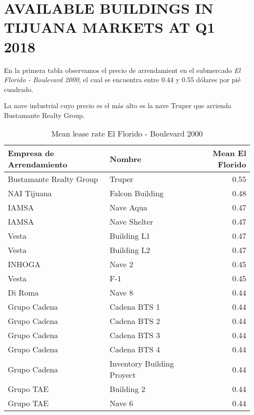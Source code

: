 \documentclass[]{article}
\title{}
\author{}
\date{}
\begin{document}
\section{AVAILABLE BUILDINGS IN TIJUANA MARKETS AT Q1
2018}\label{available-buildings-in-tijuana-markets-at-q1-2018}

\btwocol

En la primera tabla observamos el precio de arrendamient en el
submercado \emph{El Florido - Boulevard 2000}, el cual se encuentra
entre 0.44 y 0.55 dólares por pié cuadrado.

La nave industrial cuyo precio es el más alto es la nave Truper que
arrienda Bustamante Realty Group.

\begin{table}[ht]
\centering
\caption{Mean lease rate El Florido - Boulevard 2000} 
\begin{tabular}{llr}
  \hline
Empresa de Arrendamiento & Nombre & Mean El Florido \\ 
  \hline
Bustamante Realty Group & Truper & 0.55 \\ 
  NAI Tijuana & Falcon Building & 0.48 \\ 
  IAMSA & Nave Aqua & 0.47 \\ 
  IAMSA & Nave Shelter & 0.47 \\ 
  Vesta & Building L1 & 0.47 \\ 
  Vesta & Building L2 & 0.47 \\ 
  INHOGA & Nave 2 & 0.45 \\ 
  Vesta & F-1 & 0.45 \\ 
  Di Roma & Nave 8 & 0.44 \\ 
  Grupo Cadena & Cadena BTS 1 & 0.44 \\ 
  Grupo Cadena & Cadena BTS 2 & 0.44 \\ 
  Grupo Cadena & Cadena BTS 3 & 0.44 \\ 
  Grupo Cadena & Cadena BTS 4 & 0.44 \\ 
  Grupo Cadena & Inventory Building Proyect & 0.44 \\ 
  Grupo TAE & Building 2 & 0.44 \\ 
  Grupo TAE & Nave 6 & 0.44 \\ 
   \hline
\end{tabular}
\end{table}

\etwocol
\end{document}
